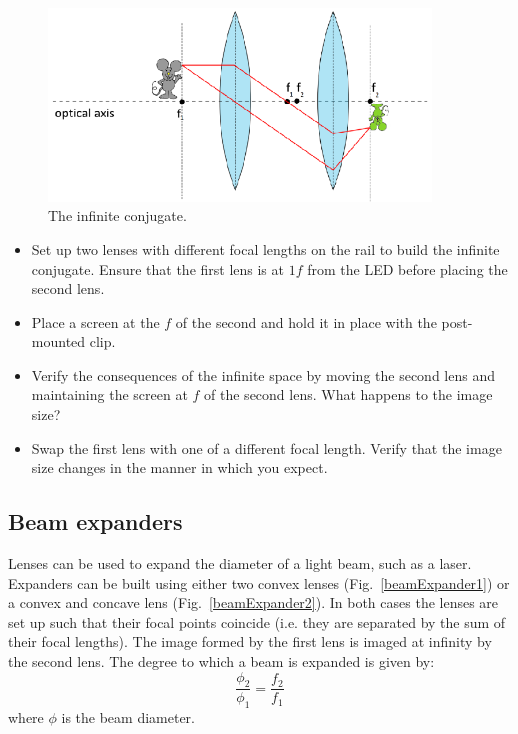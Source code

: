 \documentclass[a4paper]{report}
\begin{document}
\begin{figure}[h]
\center
\includegraphics[width=4in]{infiniteConjugate.eps}
\caption{The infinite conjugate.}
\label{infiniteConjugate}
\end{figure}

\begin{itemize}
\item Set up two lenses with different focal lengths on the rail to build the infinite conjugate. 
Ensure that the first lens is at $1f$ from the LED before placing the second lens. 
\item Place a screen at the $f$ of the second and hold it in place with the post-mounted clip.
\item Verify the consequences of the infinite space by moving the second lens and maintaining the screen at $f$ of the second lens. 
What happens to the image size?
\item Swap the first lens with one of a different focal length. 
Verify that the image size changes in the manner in which you expect. 
\end{itemize}



\clearpage


\subsection{Beam expanders}
Lenses can be used to expand the diameter of a light beam, such as a laser.
Expanders can be built using either two convex lenses (Fig.~\ref{beamExpander1}) or a convex and concave lens (Fig.~\ref{beamExpander2}). 
In both cases the lenses are set up such that their focal points coincide (i.e. they are separated by the sum of their focal lengths). 
The image formed by the first lens is imaged at infinity by the second lens.
The degree to which a beam is expanded is given by:
\begin{equation}
\frac{\phi_2}{\phi_1}=\frac{f_2}{f_1}
\label{eq:beamExp}
\end{equation}
where $\phi$ is the beam diameter.
\end{document}

